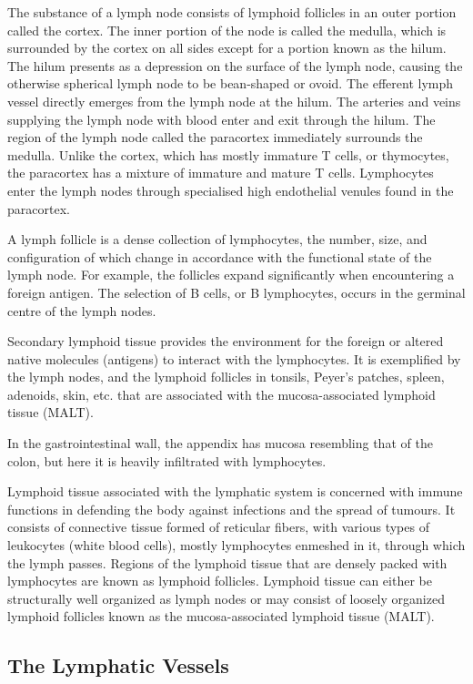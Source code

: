 The substance of a lymph node consists of lymphoid follicles in an outer portion called the cortex. The inner portion of the node is called the medulla, which is surrounded by the cortex on all sides except for a portion known as the hilum. The hilum presents as a depression on the surface of the lymph node, causing the otherwise spherical lymph node to be bean-shaped or ovoid. The efferent lymph vessel directly emerges from the lymph node at the hilum. The arteries and veins supplying the lymph node with blood enter and exit through the hilum. The region of the lymph node called the paracortex immediately surrounds the medulla. Unlike the cortex, which has mostly immature T cells, or thymocytes, the paracortex has a mixture of immature and mature T cells. Lymphocytes enter the lymph nodes through specialised high endothelial venules found in the paracortex.

A lymph follicle is a dense collection of lymphocytes, the number, size, and configuration of which change in accordance with the functional state of the lymph node. For example, the follicles expand significantly when encountering a foreign antigen. The selection of B cells, or B lymphocytes, occurs in the germinal centre of the lymph nodes.

Secondary lymphoid tissue provides the environment for the foreign or altered native molecules (antigens) to interact with the lymphocytes. It is exemplified by the lymph nodes, and the lymphoid follicles in tonsils, Peyer's patches, spleen, adenoids, skin, etc. that are associated with the mucosa-associated lymphoid tissue (MALT).

In the gastrointestinal wall, the appendix has mucosa resembling that of the colon, but here it is heavily infiltrated with lymphocytes.

Lymphoid tissue associated with the lymphatic system is concerned with immune functions in defending the body against infections and the spread of tumours. It consists of connective tissue formed of reticular fibers, with various types of leukocytes (white blood cells), mostly lymphocytes enmeshed in it, through which the lymph passes. Regions of the lymphoid tissue that are densely packed with lymphocytes are known as lymphoid follicles. Lymphoid tissue can either be structurally well organized as lymph nodes or may consist of loosely organized lymphoid follicles known as the mucosa-associated lymphoid tissue (MALT).

\hypertarget{the-lymphatic-vessels}{%
\subsection{The Lymphatic Vessels}\label{the-lymphatic-vessels}}

